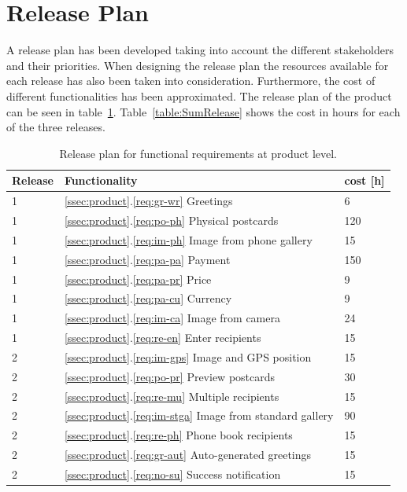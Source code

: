 \documentclass[10pt,a4paper]{article}
\begin{document}
\section{Release Plan}
A release plan has been developed taking into account the different stakeholders and their priorities. When designing the release plan the resources available for each release has also been taken into consideration. Furthermore, the cost of different functionalities has been approximated.  
The release plan of the product can be seen in table~\ref{table:release}. Table~\ref{table:SumRelease} shows the cost in hours for each of the three releases.

\begin{table}[h!]
\centering
\caption{Release plan for functional requirements at product level.}
\label{table:release}
\begin{tabular}{| l | l | l | } \hline
\textbf{Release} & \textbf{Functionality} & \textbf{cost [h]} \\ \hline
1 & \ref{ssec:product}.\ref{req:gr-wr} Greetings & 6\\ \hline
1 & \ref{ssec:product}.\ref{req:po-ph} Physical postcards & 120\\ \hline
1 & \ref{ssec:product}.\ref{req:im-ph} Image from phone gallery & 15\\ \hline
1 & \ref{ssec:product}.\ref{req:pa-pa} Payment & 150\\ \hline
1 & \ref{ssec:product}.\ref{req:pa-pr} Price & 9 \\ \hline
1 & \ref{ssec:product}.\ref{req:pa-cu} Currency & 9 \\ \hline
1 & \ref{ssec:product}.\ref{req:im-ca} Image from camera & 24\\ \hline
1 & \ref{ssec:product}.\ref{req:re-en} Enter recipients & 15\\ \hline
2 & \ref{ssec:product}.\ref{req:im-gps} Image and GPS position & 15\\ \hline
2 & \ref{ssec:product}.\ref{req:po-pr} Preview postcards & 30\\ \hline
2 & \ref{ssec:product}.\ref{req:re-mu} Multiple recipients & 15\\ \hline
2 & \ref{ssec:product}.\ref{req:im-stga} Image from standard gallery & 90\\ \hline
2 & \ref{ssec:product}.\ref{req:re-ph} Phone book recipients & 15\\ \hline
2 & \ref{ssec:product}.\ref{req:gr-aut} Auto-generated greetings & 15\\ \hline
2 & \ref{ssec:product}.\ref{req:no-su} Success notification & 15 \\ \hline

\end{tabular}
\end{table}
\end{document}
